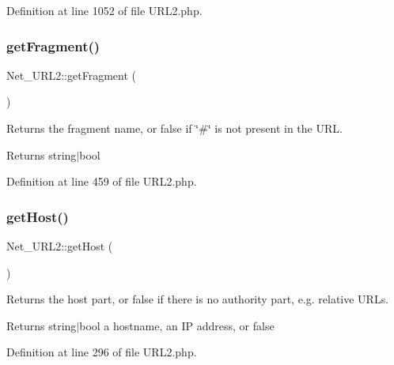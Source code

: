 Definition at line 1052 of file U\+R\+L2.\+php.

\mbox{\label{classNet__URL2_a4a72ed5275b63c5cc600a74ec33aa76c}} 
\subsubsection{\texorpdfstring{get\+Fragment()}{getFragment()}}
{\footnotesize\ttfamily Net\+\_\+\+U\+R\+L2\+::get\+Fragment (\begin{DoxyParamCaption}{ }\end{DoxyParamCaption})}

Returns the fragment name, or false if \char`\"{}\#\char`\"{} is not present in the U\+RL.

\begin{DoxyReturn}{Returns}
string$\vert$bool 
\end{DoxyReturn}


Definition at line 459 of file U\+R\+L2.\+php.

\mbox{\label{classNet__URL2_a55343faf36c62fb1942229c00c53e42c}} 
\subsubsection{\texorpdfstring{get\+Host()}{getHost()}}
{\footnotesize\ttfamily Net\+\_\+\+U\+R\+L2\+::get\+Host (\begin{DoxyParamCaption}{ }\end{DoxyParamCaption})}

Returns the host part, or false if there is no authority part, e.\+g. relative U\+R\+Ls.

\begin{DoxyReturn}{Returns}
string$\vert$bool a hostname, an IP address, or false 
\end{DoxyReturn}


Definition at line 296 of file U\+R\+L2.\+php.

\mbox{\label{classNet__URL2_ad52ea9577f6cf9ecc712e29498b686d4}} 
